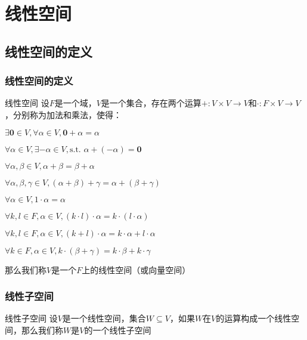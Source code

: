 \documentclass[12pt, a4paper, oneside, UTF8]{ctexbook}
\begin{document}
% 
\else
\fi
\chapter{线性空间}
	\section{线性空间的定义}
		\subsection{线性空间的定义}
			\begin{defn}{线性空间}{}
				设$F$是一个域，$V$是一个集合，存在两个运算$+:V\times V \rightarrow V$和$\cdot : F \times V \rightarrow V$，分别称为加法和乘法，使得：

				 $\exists \mathbf{0} \in V,\forall \alpha \in V,\mathbf{0}+\alpha=\alpha $

				 $\forall \alpha \in V,\exists -\alpha \in V,\text{s.t. } \alpha + (-\alpha )=\mathbf{0}$

				 $\forall \alpha, \beta \in V,\alpha + \beta = \beta + \alpha$

				 $\forall \alpha, \beta, \gamma \in V,(\alpha+\beta)+\gamma=\alpha+(\beta+\gamma)$

				 $\forall \alpha \in V,1 \cdot \alpha =\alpha $

				 $\forall k,l \in F,\alpha \in V,(k\cdot l)\cdot \alpha =k\cdot (l\cdot \alpha )$

				 $\forall k,l \in F,\alpha \in V,(k+l)\cdot \alpha=k\cdot \alpha + l\cdot \alpha  $

				 $\forall k \in F,\alpha \in V,k\cdot (\beta + \gamma )=k\cdot \beta + k\cdot \gamma $

				那么我们称$V$是一个$F$上的线性空间（或向量空间）
			\end{defn}
		\subsection{线性子空间}
			\begin{defn}{线性子空间}{}
				设$V$是一个线性空间，集合$W \subseteq V$，如果$W$在$V$的运算构成一个线性空间，那么我们称$W$是$V$的一个线性子空间
			\end{defn}
\end{document}
